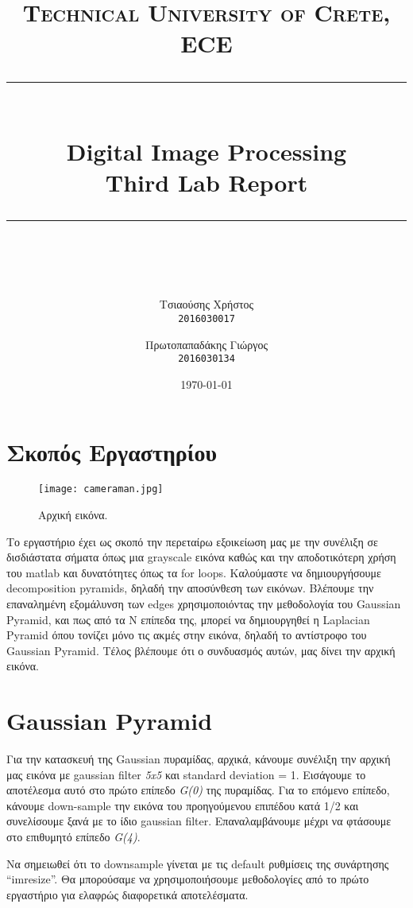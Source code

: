 \documentclass[11pt]{scrartcl} %
\title{
	\normalfont\normalsize
	\textsc{Technical University of Crete, ECE}\\ %
	\vspace{25pt} %
	\rule{\linewidth}{0.5pt}\\ %
	\vspace{20pt} %
	{\Huge Digital Image Processing}\\ %

	{\huge Third Lab Report}\\ %
	\vspace{12pt} %
	\rule{\linewidth}{2pt}\\ %
	\vspace{12pt} %
}
\author{\LARGE{Τσιαούσης Χρήστος}\\
		\texttt{2016030017}
		\and
		\LARGE{Πρωτοπαπαδάκης Γιώργος}\\
		\texttt{2016030134}}%
\date{\normalsize\today} %
\begin{document}
\maketitle %


\section{Σκοπός Εργαστηρίου}

\begin{figure}[h] %
	\centering
	\texttt{[image: cameraman.jpg]} %
	\caption{Αρχική εικόνα.}
\end{figure}


Το εργαστήριο έχει ως σκοπό την περεταίρω εξοικείωση μας με την συνέλιξη σε δισδιάστατα σήματα όπως μια grayscale εικόνα καθώς και την αποδοτικότερη
χρήση του matlab και δυνατότητες όπως τα for loops. Καλούμαστε να δημιουργήσουμε decomposition pyramids, δηλαδή την αποσύνθεση των εικόνων. Βλέπουμε
την επαναλημένη εξομάλυνση των edges χρησιμοποιόντας την μεθοδολογία του Gaussian Pyramid, και πως από τα Ν επίπεδα της, μπορεί να δημιουργηθεί η
Laplacian Pyramid όπου τονίζει μόνο τις ακμές στην εικόνα, δηλαδή το αντίστροφο του Gaussian Pyramid. Τέλος βλέπουμε ότι ο συνδυασμός αυτών, μας δίνει
την αρχική εικόνα.

\section{Gaussian Pyramid}

Για την κατασκευή της Gaussian πυραμίδας, αρχικά, κάνουμε συνέλιξη την αρχική μας εικόνα με gaussian filter \textit{5x5} και standard deviation = 1.
Εισάγουμε το αποτέλεσμα αυτό στο πρώτο επίπεδο \textit{G(0)} της πυραμίδας. Για το επόμενο επίπεδο, κάνουμε down-sample την εικόνα του προηγούμενου
επιπέδου κατά 1/2 και συνελίσουμε ξανά με το ίδιο gaussian filter. Επαναλαμβάνουμε μέχρι να φτάσουμε στο επιθυμητό επίπεδο \textit{G(4)}.


Να σημειωθεί ότι το downsample γίνεται με τις default ρυθμίσεις της συνάρτησης ``imresize''. Θα μπορούσαμε να χρησιμοποιήσουμε μεθοδολογίες από
το πρώτο εργαστήριο για ελαφρώς διαφορετικά αποτελέσματα.
\end{document}
